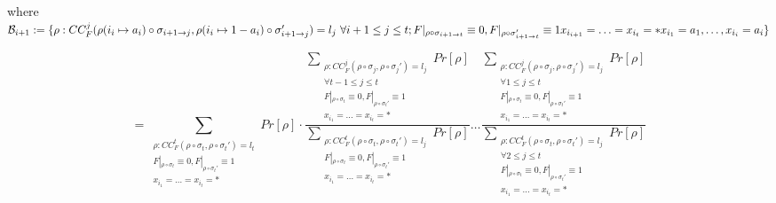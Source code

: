 where 
$  
\mathcal{B}_{i+1} := \{\rho: CC_F^{j}(\rho(i_i \mapsto a_i)\circ \sigma_{i+1 \to j}, \rho(i_i \mapsto 1-a_i) \circ \sigma_{i+1 \to j}')= l_j \ \forall i+1\leq j \leq t; \\
F|_{\rho\circ \sigma_{i+1 \to t}} \equiv 0, F|_{\rho\circ \sigma_{i+1 \to t}'}\equiv 1\;\\
x_{i_{i+1}}=\ldots= x_{i_t} = *\\ 
x_{i_1} = a_1, \dots, x_{i_i}=a_i \}
$


$$
=\underset{\substack{\rho: CC_F^{t}(\rho\circ \sigma_t, \rho \circ \sigma_t')= l_t\\ F|_{\rho\circ \sigma_t} \equiv 0, F|_{\rho\circ \sigma_t'}\equiv 1\\x_{i_1}= \dots =x_{i_t} = *}} {\sum}Pr[\rho] \cdot 
%
\frac{\underset{\substack{\rho: CC_F^{j}(\rho\circ \sigma_j, \rho \circ \sigma_j')= l_j\\ \forall t-1\leq j \leq t\\ F|_{\rho\circ \sigma_t} \equiv 0, F|_{\rho\circ \sigma_t'}\equiv 1\\x_{i_1}=\dots = x_{i_t} = *}} {\sum}Pr[\rho]}
{\underset{\substack{\rho: CC_F^{t}(\rho\circ \sigma_t, \rho \circ \sigma_t')= l_j\\ F|_{\rho\circ \sigma_t} \equiv 0, F|_{\rho\circ \sigma_t'}\equiv 1\\ x_{i_1}= \dots =x_{i_t} = *}} {\sum}Pr[\rho]} \dots
%
\frac{\underset{\substack{\rho: CC_F^{j}(\rho\circ \sigma_j, \rho \circ \sigma_j')= l_j\\ \forall 1\leq j \leq t\\ F|_{\rho\circ \sigma_t} \equiv 0, F|_{\rho\circ \sigma_t'}\equiv 1\\x_{i_1}= \dots = x_{i_t} =*}} {\sum}Pr[\rho]}
{\underset{\substack{\rho: CC_F^{t}(\rho\circ \sigma_t, \rho \circ \sigma_t')= l_j\\ \forall 2\leq j \leq t\\F|_{\rho\circ \sigma_t} \equiv 0, F|_{\rho\circ \sigma_t'}\equiv 1\\x_{i_1}=\dots =x_{i_t} = *}} {\sum}Pr[\rho]}
$$



